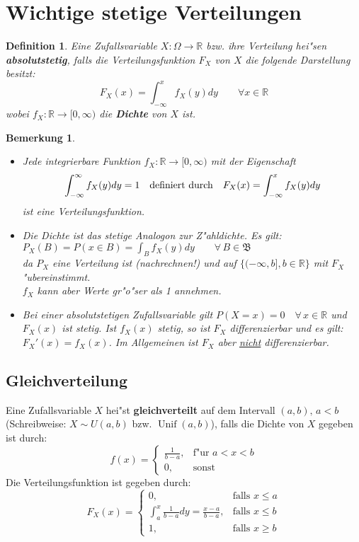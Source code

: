 \documentclass[a4paper,11pt]{book}
\newcommand{\R}{{\mathbb R}}
\DeclareMathOperator{\unif}{Unif}
\def\BB{ \mathfrak{B} }
\newtheorem{Def}{Definition}[chapter]
\newtheorem{Bem}{Bemerkung}[chapter]
\theoremstyle{nonumberplain}
\begin{document}
\section{Wichtige stetige Verteilungen}

\begin{Def}
Eine Zufallsvariable $X:\Omega \rightarrow \R$ bzw. ihre Verteilung hei"sen \textbf{absolutstetig}, falls die Verteilungsfunktion $F_X$ von $X$ die folgende Darstellung besitzt:
\[F_X(x)=\int_{-\infty}^x f_X(y)dy \qquad \forall x\in\R\]
wobei $f_X:\R\rightarrow [0,\infty)$ die \textbf{Dichte} von $X$ ist.
\end{Def}

\begin{Bem}$\ $\\
\begin{itemize}
\item [a)] Jede integrierbare Funktion $f_X:\R\rightarrow [0,\infty)$ mit der Eigenschaft 
\[\int_{-\infty}^\infty f_X(y)dy = 1 \quad\textnormal{definiert durch}\quad F_X(x)=\int_{-\infty}^x f_X(y)dy\]
ist eine Verteilungsfunktion.
\item[b)] Die Dichte ist das stetige Analogon zur Z"ahldichte. Es gilt:\\
$P_X(B)=P(x\in B)=\int_B f_X(y)dy \qquad \forall\,B\in\BB$\\
da $P_X$ eine Verteilung ist (nachrechnen!) und auf $\{(-\infty,b],b\in\R\}$ mit $F_X$ "ubereinstimmt.\\
$f_X$ kann aber Werte gr"o"ser als 1 annehmen.
\item[c)] Bei einer absolutstetigen Zufallsvariable gilt $P(X=x)=0\quad \forall\,x\in\R$ und $F_X(x)$ ist stetig. Ist $f_X(x)$ stetig, so ist $F_X$ differenzierbar und es gilt:\\ $F_X'(x)=f_X(x)$. Im Allgemeinen ist $F_X$ aber \underline{nicht} differenzierbar.
\end{itemize}
\end{Bem}

\subsection{Gleichverteilung}
Eine Zufallsvariable $X$ hei"st \textbf{gleichverteilt} auf dem Intervall $(a,b),\,a<b$ (Schreibweise: $X\sim U(a,b)$ bzw. $\unif(a,b)$), falls die Dichte von $X$ gegeben ist durch:
\[f(x)=
\begin{cases}
\frac{1}{b-a}, & \text{f"ur } a<x<b\\
0, & \text{sonst}
\end{cases}
\]
Die Verteilungsfunktion ist gegeben durch:
\[F_X(x)=\begin{cases}
 0, & \text{falls } x\leq a\\
 \int_a^x \frac{1}{b-a}dy = \frac{x-a}{b-a}, & \text{falls }x\leq b\\
  1, & \text{falls } x\geq b
\end{cases}
\]
\end{document}
